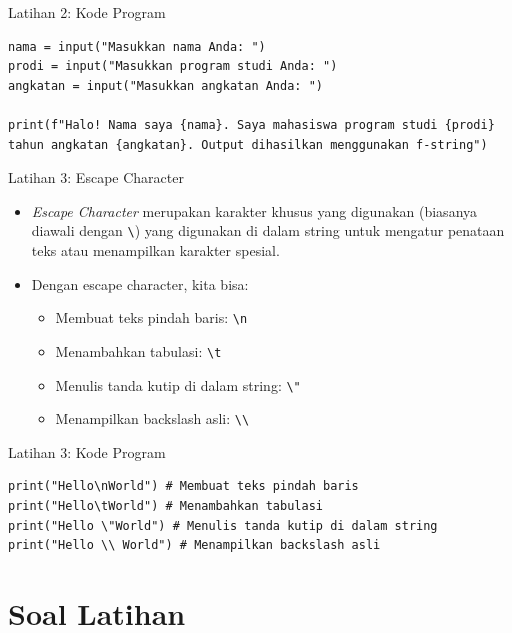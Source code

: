 \documentclass[aspectratio=169, table]{beamer}
\begin{document}
\begin{frame}[fragile]{Latihan 2: Kode Program}
\begin{lstlisting}[style=PythonStyle]
nama = input("Masukkan nama Anda: ")
prodi = input("Masukkan program studi Anda: ")
angkatan = input("Masukkan angkatan Anda: ")

print(f"Halo! Nama saya {nama}. Saya mahasiswa program studi {prodi} tahun angkatan {angkatan}. Output dihasilkan menggunakan f-string")
\end{lstlisting}
\end{frame}

\begin{frame}[fragile]{Latihan 3: Escape Character}
\begin{itemize}
\item \textit{Escape Character} merupakan karakter khusus yang digunakan (biasanya diawali dengan \texttt{\textbackslash}) yang digunakan di dalam string untuk mengatur penataan teks atau menampilkan karakter spesial.
\item Dengan escape character, kita bisa:

\begin{itemize}
    \item Membuat teks pindah baris: \texttt{\textbackslash n}
    \item Menambahkan tabulasi: \texttt{\textbackslash t}
    \item Menulis tanda kutip di dalam string: \texttt{\textbackslash "}
    \item Menampilkan backslash asli: \texttt{\textbackslash\textbackslash}
\end{itemize}

\end{itemize}
\end{frame}

\begin{frame}[fragile]{Latihan 3: Kode Program}
\begin{lstlisting}[style=PythonStyle, firstnumber=1]
print("Hello\nWorld") # Membuat teks pindah baris
print("Hello\tWorld") # Menambahkan tabulasi
print("Hello \"World") # Menulis tanda kutip di dalam string
print("Hello \\ World") # Menampilkan backslash asli
\end{lstlisting}
\end{frame}

\section{Soal Latihan}
\end{document}
